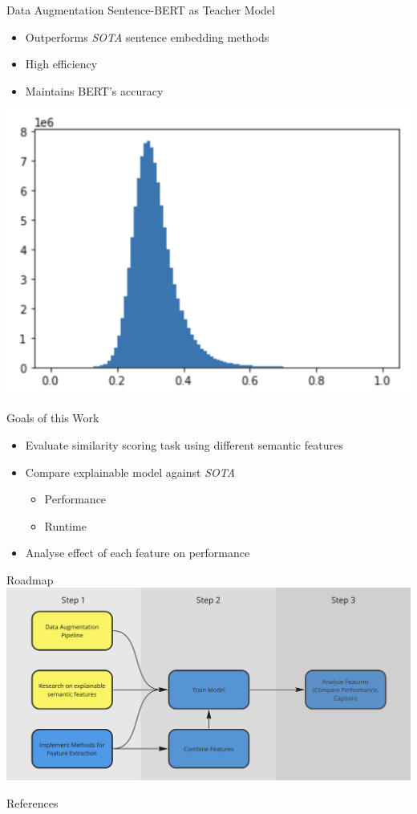 \documentclass[10pt, compress]{beamer}
\begin{document}
\addtocounter{framenumber}{-1}
\begin{frame}[t]{Data Augmentation}
Sentence-BERT as Teacher Model
\begin{itemize}
	\item Outperforms \textit{SOTA} sentence embedding methods
	\item High efficiency
	\item Maintains BERT's accuracy
\end{itemize}
\vspace{-1cm}\raggedleft
\includegraphics[width=.5\textwidth]{gfx/distribution}
\end{frame}


\begin{frame}{Goals of this Work}
\begin{itemize}
	\item Evaluate similarity scoring task using different semantic features
	\item Compare explainable model against \textit{SOTA}
	\begin{itemize}
		\item Performance
		\item Runtime
	\end{itemize}
	\item Analyse effect of each feature on performance
\end{itemize}
\end{frame}


\begin{frame}{Roadmap}
\hspace*{-1cm}
\includegraphics[width=\paperwidth]{gfx/Roadmap}
\end{frame}


\begin{frame}{References}
    \AtNextBibliography{\tiny}
    \printbibliography
\end{frame}

\begingroup
{}
\endgroup
\end{document}
